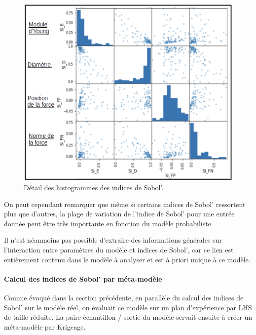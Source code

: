 \documentclass[a4paper,10pt]{article}
\begin{document}
\begin{figure}[H]
   \centering
   \noindent \includegraphics[width = \linewidth]{histogram_sobol.png}
      \caption{Détail des histogrammes des  indices de Sobol'.}
         \label{histogram_sobol}
\end{figure}

On peut cependant remarquer que même si certains indices de Sobol' ressortent plus que d'autres, la plage de variation de l'indice de Sobol' pour une entrée donnée peut être très importante en fonction du modèle probabiliste. \par \smallskip

Il n'est néanmoins pas possible d'extraire des informations générales sur l'interaction entre paramètres du modèle et indices de Sobol', car ce lien est entièrement contenu dans le modèle à analyser et est à priori unique à ce modèle.

\paragraph{Calcul des indices de Sobol' par méta-modèle} 
 
 Comme évoqué dans la section précédente, en parallèle du calcul des indices de Sobol' sur le modèle réel, on évaluait ce modèle sur un plan d’expérience par LHS de taille réduite. La paire échantillon / sortie du modèle servait ensuite à créer un méta-modèle par Krigeage. \par \smallskip
 
\end{document}
